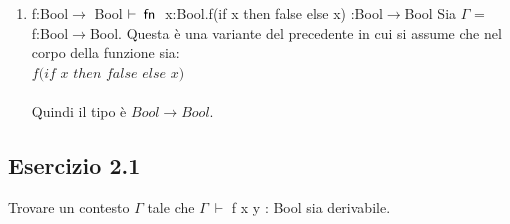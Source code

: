 \begin{enumerate}[label=\alph*), leftmargin=*]
		
	\vspace*{1 cm}
	\item f:Bool$\rightarrow$ Bool $\vdash\:\fn$ x:Bool.f(if x then false else x) :Bool$\rightarrow$Bool 
		Sia $\Gamma$ = f:Bool$\rightarrow$Bool. Questa \`e una variante del precedente in cui si assume che nel corpo della funzione sia:\\  $f(if$ $x$ $then$ $false$ $else$ $x)$\\
		 \\
		Quindi il tipo \`e $Bool \rightarrow Bool$.	
		
		
\end{enumerate}
 
    \vspace*{1 cm}

\subsection*{Esercizio 2.1}
Trovare un contesto $\Gamma$ tale che $\Gamma\:\vdash$ f x y : Bool sia derivabile.

